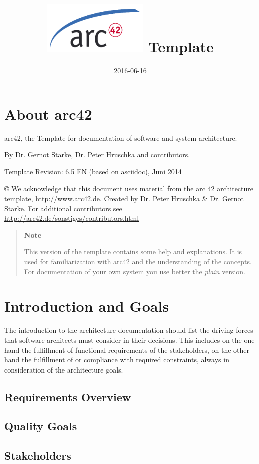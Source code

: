 \documentclass[]{article}
\title{\includegraphics{images/arc42-logo.png} Template}
\date{2016-06-16}
\begin{document}
\maketitle

\section{About arc42}

arc42, the Template for documentation of software and system
architecture.

By Dr. Gernot Starke, Dr. Peter Hruschka and contributors.

Template Revision: 6.5 EN (based on asciidoc), Juni 2014

© We acknowledge that this document uses material from the arc 42
architecture template, \url{http://www.arc42.de}. Created by Dr. Peter
Hruschka \& Dr. Gernot Starke. For additional contributors see
\url{http://arc42.de/sonstiges/contributors.html}

\begin{quote}
\textbf{Note}

This version of the template contains some help and explanations. It is
used for familiarization with arc42 and the understanding of the
concepts. For documentation of your own system you use better the
\emph{plain} version.
\end{quote}

\section{Introduction and Goals}

The introduction to the architecture documentation should list the
driving forces that software architects must consider in their
decisions. This includes on the one hand the fulfillment of functional
requirements of the stakeholders, on the other hand the fulfillment of
or compliance with required constraints, always in consideration of the
architecture goals.

\subsection{Requirements Overview}

\subsection{Quality Goals}

\subsection{Stakeholders}
\end{document}
